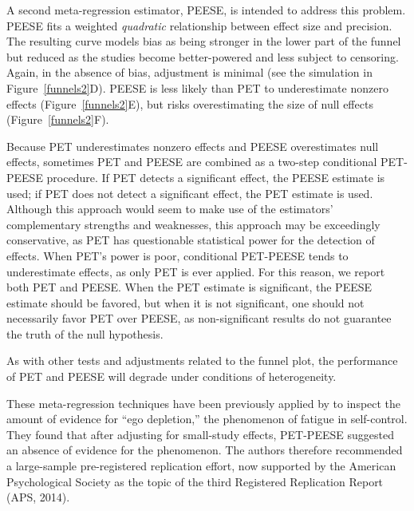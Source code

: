 \documentclass[man, mask]{apa6}
\begin{document}
A second meta-regression estimator, PEESE, is intended to address this problem. PEESE fits a weighted {\em quadratic} relationship between effect size and precision. The resulting curve models bias as being stronger in the lower part of the funnel but reduced as the studies become better-powered and less subject to censoring. Again, in the absence of bias, adjustment is minimal (see the simulation in Figure~\ref{funnels2}D). PEESE is less likely than PET to underestimate nonzero effects (Figure~\ref{funnels2}E), but risks overestimating the size of null effects (Figure~\ref{funnels2}F).

Because PET underestimates nonzero effects and PEESE overestimates null effects, sometimes PET and PEESE are combined as a two-step conditional PET-PEESE procedure. If PET detects a significant effect, the PEESE estimate is used; if PET does not detect a significant effect, the PET estimate is used. Although this approach would seem to make use of the estimators' complementary strengths and weaknesses, this approach may be exceedingly conservative, as PET has questionable statistical power for the detection of effects. When PET's power is poor, conditional PET-PEESE tends to underestimate effects, as only PET is ever applied. For this reason, we report both PET and PEESE. When the PET estimate is significant, the PEESE estimate should be favored, but when it is not significant, one should not necessarily favor PET over PEESE, as non-significant results do not guarantee the truth of the null hypothesis.

As with other tests and adjustments related to the funnel plot, the performance of PET and PEESE will degrade under conditions of heterogeneity.

These meta-regression techniques have been previously applied by \citet{Carter:McCullough:2014} to inspect the amount of evidence for ``ego depletion,'' the phenomenon of fatigue in self-control. They found that after adjusting for small-study effects, PET-PEESE suggested an absence of evidence for the phenomenon. The authors therefore recommended a large-sample pre-registered replication effort, now supported by the American Psychological Society as the topic of the third Registered Replication Report (APS, 2014). \nocite{APS:2014}
\end{document}
